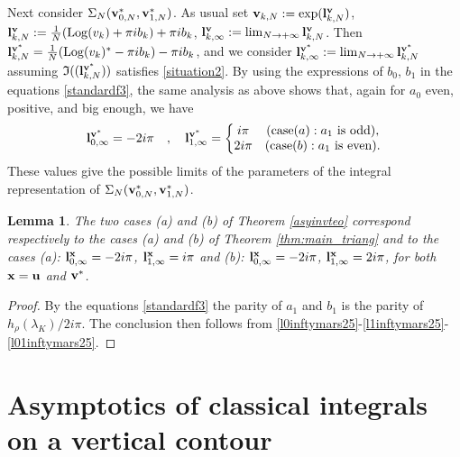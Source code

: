 \documentclass[11pt]{amsart}
\newtheorem{lem}[teo]{Lemma}
\newcommand{\bu}{{\bf u}}
\newcommand{\bx}{{\bf x}}
\newcommand{\bv}{{\bf v}}
\newcommand{\bl}{{\bf l}}
\newcommand{\Log}{{\rm Log}}
\newcommand{\ra}{\rightarrow}
\begin{document}
{Next consider $\Sigma_N(\bv_{0,N}^*,\bv_{1,N}^*)$. As usual set $\bv_{k,N} := \exp(\bl_{k,N}^\bv)$, $\textstyle \bl_{k,N}^\bv:= \frac{1}{N}(\Log(v_{k}) +\pi ib_{k}) + \pi i b_k$, $\bl_{k,\infty}^\bv := \textstyle \lim_{N\ra +\infty} \bl_{k,N}^\bv$. Then $\textstyle \bl_{k,N}^{\bv^*}= \frac{1}{N}(\Log(v_{k})^* -\pi ib_{k}) - \pi i b_k$, and we consider $\bl_{k,\infty}^{\bv^*} := \textstyle \lim_{N\ra +\infty} \bl_{k,N}^{\bv^*}$ assuming $\mathfrak{I}((\bl_{k,N}^{\bv^*}))$ satisfies \eqref{situation2}. By using the expressions of $b_0$, $b_1$ in the equations \eqref{standardf3}, the same analysis as above shows that, again for $a_0$ even, positive, and big enough, we have
\begin{equation}\label{l01inftymars25}
\bl_{0,\infty}^{\bv^*} = -2i\pi
\quad ,\quad \bl_{1,\infty}^{\bv^*} = \left \{\begin{matrix}
i\pi & \text{(case} (a): a_1 \ \text{is\ odd}),\\
2i\pi & \text{(case} (b): a_1 \ \text{is\ even}).
\end{matrix}
\right.
\end{equation}
These values give the possible limits of the parameters of the integral representation of $\Sigma_N(\bv_{0,N}^*,\bv_{1,N}^*)$.

\begin{lem}\label{rem:reduction:sigma:integral} The two cases (a) and (b) of Theorem \ref{asyinvteo} correspond respectively to the cases (a) and (b) of Theorem \ref{thm:main_triang} and to the cases (a):  $\bl_{0,\infty}^\bx = -2i\pi$, $\bl_{1,\infty}^\bx = i\pi$ and (b): $\bl_{0,\infty}^\bx = -2i\pi$, $\bl_{1,\infty}^\bx = 2i\pi$, for both $\bx = \bu$ and $\bv^*$. 
\end{lem}
\begin{proof} By the equations \eqref{standardf3} the parity of $a_1$ and $b_1$ is the parity of $h_\rho(\lambda_K)/2i\pi$. The conclusion then follows from \eqref{l0inftymars25}-\eqref{l1inftymars25}-\eqref{l01inftymars25}.
\end{proof}

\section{Asymptotics of classical integrals on a vertical contour}\label{sec:SPM}

}
\end{document}
